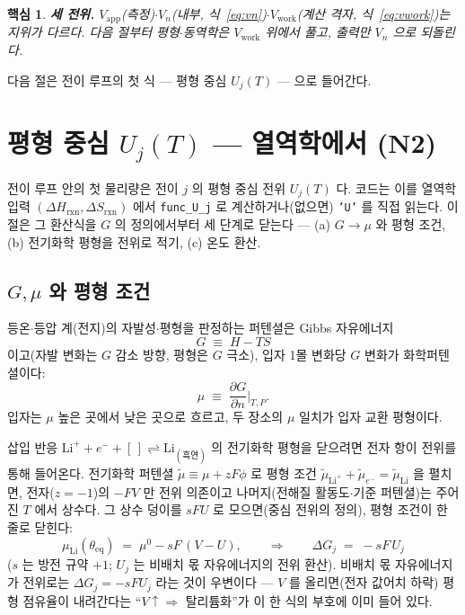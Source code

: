 \documentclass[11pt,a4paper]{article}
\newtheorem*{keybox}{핵심}
\newcommand{\eq}{\mathrm{eq}}
\newcommand{\app}{\mathrm{app}}
\newcommand{\rxn}{\mathrm{rxn}}
\newcommand{\work}{\mathrm{work}}
\newcommand{\code}[1]{\texttt{#1}}
\begin{document}
\begin{keybox}
\textbf{세 전위.} $V_\app$(측정)$\cdot$$V_n$(내부, 식~\eqref{eq:vn})$\cdot$$V_\work$(계산 격자, 식~\eqref{eq:vwork})는
지위가 다르다. 다음 절부터 평형$\cdot$동역학은 $V_\work$ 위에서 풀고, 출력만 $V_n$ 으로 되돌린다.
\end{keybox}

다음 절은 전이 루프의 첫 식 — 평형 중심 $U_j(T)$ — 으로 들어간다.

\section{평형 중심 $U_j(T)$ — 열역학에서 (N2)}\label{sec:center}
전이 루프 안의 첫 물리량은 전이 $j$ 의 평형 중심 전위 $U_j(T)$ 다. 코드는 이를 열역학 입력 $(\Delta H_\rxn,\Delta S_\rxn)$
에서 \code{func\_U\_j} 로 계산하거나(없으면) \code{'U'} 를 직접 읽는다. 이 절은 그 환산식을 $G$ 의 정의에서부터
세 단계로 닫는다 — (a) $G\to\mu$ 와 평형 조건, (b) 전기화학 평형을 전위로 적기, (c) 온도 환산.

\subsection{$G,\mu$ 와 평형 조건}
등온$\cdot$등압 계(전지)의 자발성$\cdot$평형을 판정하는 퍼텐셜은 Gibbs 자유에너지
\begin{equation}
G\;\equiv\;H-TS
\label{eq:gibbsdef}
\end{equation}
이고(자발 변화는 $G$ 감소 방향, 평형은 $G$ 극소), 입자 1몰 변화당 $G$ 변화가 화학퍼텐셜이다:
\begin{equation}
\mu\;\equiv\;\frac{\partial G}{\partial n}\Big|_{T,P}.
\label{eq:mudef}
\end{equation}
입자는 $\mu$ 높은 곳에서 낮은 곳으로 흐르고, 두 장소의 $\mu$ 일치가 입자 교환 평형이다.

삽입 반응 $\mathrm{Li}^++e^-+[\,]\rightleftharpoons\mathrm{Li}_{(\text{흑연})}$ 의 전기화학 평형을 닫으려면 전자 항이
전위를 통해 들어온다. 전기화학 퍼텐셜 $\tilde\mu\equiv\mu+zF\phi$ 로 평형 조건 $\tilde\mu_{\mathrm{Li}^+}+\tilde\mu_{e^-}=
\tilde\mu_\mathrm{Li}$ 을 펼치면, 전자($z=-1$)의 $-FV$ 만 전위 의존이고 나머지(전해질 활동도$\cdot$기준 퍼텐셜)는 주어진
$T$ 에서 상수다. 그 상수 덩이를 $sFU$ 로 모으면(중심 전위의 정의), 평형 조건이 한 줄로 닫힌다:
\begin{equation}
\mu_\mathrm{Li}(\theta_\eq)\;=\;\mu^0-sF\,(V-U),
\qquad\Longrightarrow\qquad \Delta G_j\;=\;-sF\,U_j
\label{eq:eqcond}
\end{equation}
($s$ 는 방전 규약 $+1$; $U_j$ 는 비배치 몫 자유에너지의 전위 환산). 비배치 몫 자유에너지가 전위로는
$\Delta G_j=-sFU_j$ 라는 것이 우변이다 — $V$ 를 올리면(전자 값어치 하락) 평형 점유율이 내려간다는
``$V\!\uparrow\Rightarrow$ 탈리튬화''가 이 한 식의 부호에 이미 들어 있다.
\end{document}
